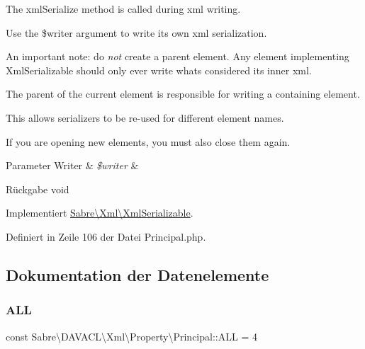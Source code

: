 The xml\+Serialize method is called during xml writing.

Use the \$writer argument to write its own xml serialization.

An important note\+: do {\itshape not} create a parent element. Any element implementing Xml\+Serializable should only ever write what\textquotesingle{}s considered its \textquotesingle{}inner xml\textquotesingle{}.

The parent of the current element is responsible for writing a containing element.

This allows serializers to be re-\/used for different element names.

If you are opening new elements, you must also close them again.


\begin{DoxyParams}[1]{Parameter}
Writer & {\em \$writer} & \\
\hline
\end{DoxyParams}
\begin{DoxyReturn}{Rückgabe}
void 
\end{DoxyReturn}


Implementiert \mbox{\hyperlink{interface_sabre_1_1_xml_1_1_xml_serializable_aa78f3ee43aa699be8347181653a53d8c}{Sabre\textbackslash{}\+Xml\textbackslash{}\+Xml\+Serializable}}.



Definiert in Zeile 106 der Datei Principal.\+php.



\subsection{Dokumentation der Datenelemente}
\mbox{\label{class_sabre_1_1_d_a_v_a_c_l_1_1_xml_1_1_property_1_1_principal_a8522507e167128f97914f5927631b20b}} 
\subsubsection{\texorpdfstring{A\+LL}{ALL}}
{\footnotesize\ttfamily const Sabre\textbackslash{}\+D\+A\+V\+A\+C\+L\textbackslash{}\+Xml\textbackslash{}\+Property\textbackslash{}\+Principal\+::\+A\+LL = 4}


